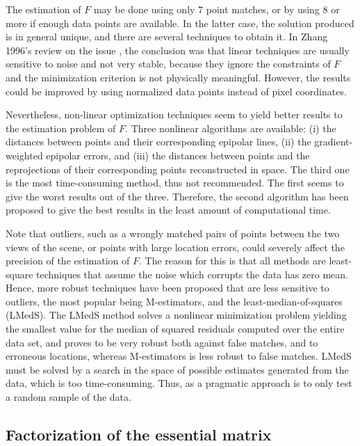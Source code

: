 The estimation of $F$ may be done using only 7 point matches, or by using 8 or more if enough data points are available. In the latter case, the solution produced is in general unique, and there are several techniques to obtain it. In Zhang 1996's review on the issue \cite{detep}, the conclusion was that linear techniques are usually sensitive to noise and not very stable, because they ignore the constraints of $F$ and the minimization criterion is not physically meaningful. However, the results could be improved by using normalized data points instead of pixel coordinates. 

Nevertheless, non-linear optimization techniques seem to yield better results to the estimation problem of $F$. Three nonlinear algorithms are available: (i) the distances between points and their corresponding epipolar lines, (ii) the gradient-weighted epipolar errors, and (iii) the distances between points and the reprojections of their corresponding points reconstructed in space. The third one is the most time-consuming method, thus not recommended. The first seems to give the worst results out of the three. Therefore, the second algorithm has been proposed to give the best results in the least amount of computational time.

Note that outliers, such as a wrongly matched pairs of points between the two views of the scene, or points with large location errors, could severely affect the precision of the estimation of $F$. The reason for this is that all methods are least-square techniques that assume the noise which corrupts the data has zero mean. Hence, more robust techniques have been proposed that are less sensitive to outliers, the most popular being M-estimators, and the least-median-of-squares (LMedS). The LMedS method solves a nonlinear minimization problem yielding the smallest value for
the median of squared residuals computed over the entire data set, and proves to be very robust both against false matches, and to erroneous locations, whereas M-estimators is less robust to false matches. LMedS must be solved by a search in the space of possible estimates generated from the data, which is too time-consuming. Thus, as a pragmatic approach is to only test a random sample of the data.\\

\subsection{Factorization of the essential matrix}

